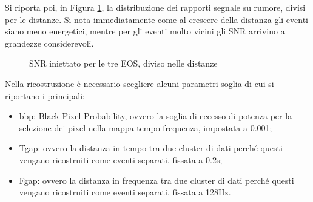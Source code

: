 Si riporta poi, in Figura \ref{fig:SNR_INJ_REC_COUNTS}, la distribuzione dei rapporti segnale su rumore, divisi per le distanze. Si nota immediatamente come al crescere della distanza gli eventi siano meno energetici, mentre per gli eventi molto vicini gli SNR arrivino a grandezze considerevoli. \\
\begin{figure}[ht]
	\vspace{-10pt}
	\centering
	\vspace{-5pt}
	\caption{SNR iniettato per le tre EOS, diviso nelle distanze}
	\label{fig:SNR_INJ_REC_COUNTS}
	\vspace{-15pt}
\end{figure}
Nella ricostruzione è necessario scegliere alcuni parametri soglia di cui si riportano i principali:
\begin{itemize}
	\item bbp: Black Pixel Probability, ovvero la soglia di eccesso di potenza per la selezione dei pixel nella mappa tempo-frequenza, impostata a 0.001;
	\item Tgap: ovvero la distanza in tempo tra due cluster di dati perché questi vengano ricostruiti come eventi separati, fissata a 0.2s;
	\item Fgap: ovvero la distanza in frequenza tra due cluster di dati perché questi vengano ricostruiti come eventi separati, fissata a 128Hz.
\end{itemize}

